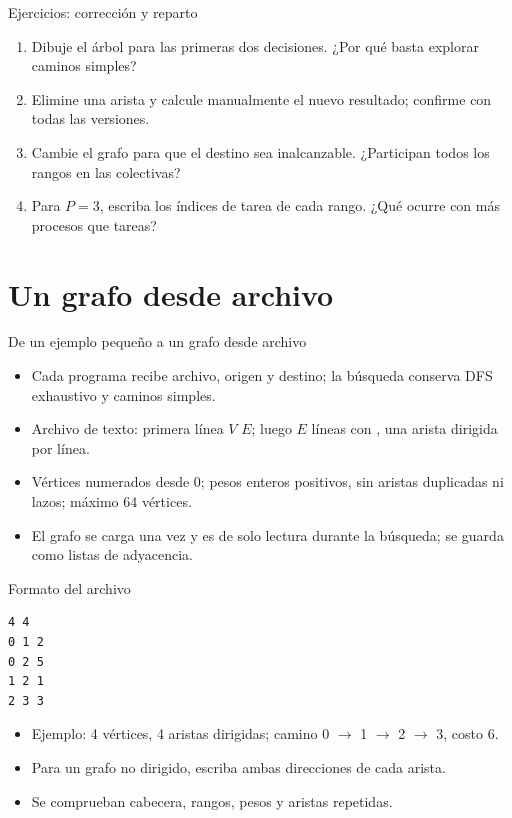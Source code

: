 \documentclass[handout,aspectratio=169,10pt]{beamer}
\newcommand{\code}[1]{\texttt{\detokenize{#1}}}
\begin{document}
\begin{frame}{Ejercicios: corrección y reparto}
\begin{enumerate}[<+->]\item Dibuje el árbol para las primeras dos decisiones. ¿Por qué basta explorar caminos simples?\item Elimine una arista y calcule manualmente el nuevo resultado; confirme con todas las versiones.\item Cambie el grafo para que el destino sea inalcanzable. ¿Participan todos los rangos en las colectivas?\item Para $P=3$, escriba los índices de tarea de cada rango. ¿Qué ocurre con más procesos que tareas?\end{enumerate}
\end{frame}

\section{Un grafo desde archivo}
\begin{frame}{De un ejemplo pequeño a un grafo desde archivo}
\begin{itemize}[<+->]
\item Cada programa recibe archivo, origen y destino; la búsqueda conserva DFS exhaustivo y caminos simples.
\item Archivo de texto: primera línea $V$ $E$; luego $E$ líneas con \code{origen destino peso}, una arista dirigida por línea.
\item Vértices numerados desde 0; pesos enteros positivos, sin aristas duplicadas ni lazos; máximo 64 vértices.
\item El grafo se carga una vez y es de solo lectura durante la búsqueda; se guarda como listas de adyacencia.
\end{itemize}
\end{frame}
\begin{frame}[fragile]{Formato del archivo}
\begin{lstlisting}
4 4
0 1 2
0 2 5
1 2 1
2 3 3
\end{lstlisting}
\begin{itemize}[<+->]
\item Ejemplo: 4 vértices, 4 aristas dirigidas; camino 0 $\to$ 1 $\to$ 2 $\to$ 3, costo 6.
\item Para un grafo no dirigido, escriba ambas direcciones de cada arista.
\item Se comprueban cabecera, rangos, pesos y aristas repetidas.
\end{itemize}
\end{frame}
\end{document}
